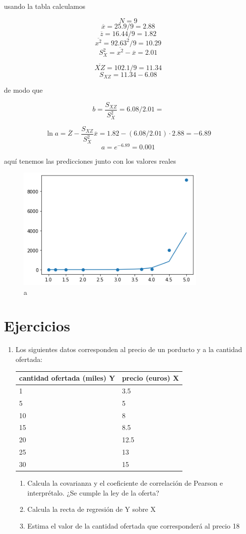 \documentclass[
]{article}
\providecommand{\tightlist}{%
  \setlength{\itemsep}{0pt}\setlength{\parskip}{0pt}}
\begin{document}
usando la tabla calculamos

\[N=9\] \[\overline{x} = 25.9/9 = 2.88\]
\[\overline{z} = 16.44/9 = 1.82\] \[\overline{x^2}=92.63^2/9 = 10.29\]
\[S^2_X=\overline{x^2} - \overline{x} = 2.01\]

\[\overline{XZ} = 102.1/9 = 11.34\] \[S_{XZ}=11.34 - 6.08\]

de modo que

\[b = \frac{S_{XZ}}{S^2_X} = 6.08/2.01 = \]

\[\ln a = \overline{Z} - \frac{S_{XZ}}{S^2_X} \overline x = 1.82 - (6.08/2.01)\cdot 2.88 = -6.89\]
\[a = e^{ -6.89} = 0.001\]

aquí tenemos las predicciones junto con los valores reales

\begin{figure}
\centering
\includegraphics[width=3.64583in,height=\textheight]{exponential_regression3.png}
\caption{a}
\end{figure}

\hypertarget{ejercicios}{%
\section{Ejercicios}\label{ejercicios}}

\begin{enumerate}
\def\labelenumi{\arabic{enumi}.}
\item
  Los siguientes datos corresponden al precio de un porducto y a la
  cantidad ofertada:

  \begin{longtable}[]{@{}ll@{}}
  \toprule
  cantidad ofertada (miles) Y & precio (euros) X\tabularnewline
  \midrule
  \endhead
  1 & 3.5\tabularnewline
  5 & 5\tabularnewline
  10 & 8\tabularnewline
  15 & 8.5\tabularnewline
  20 & 12.5\tabularnewline
  25 & 13\tabularnewline
  30 & 15\tabularnewline
  \bottomrule
  \end{longtable}

  \begin{enumerate}
  \def\labelenumii{\arabic{enumii}.}
  \tightlist
  \item
    Calcula la covarianza y el coeficiente de correlación de Pearson e
    interprétalo. ¿Se cumple la ley de la oferta?
  \item
    Calcula la recta de regresión de Y sobre X
  \item
    Estima el valor de la cantidad ofertada que corresponderá al precio
    18
  \end{enumerate}
\end{enumerate}
\end{document}
